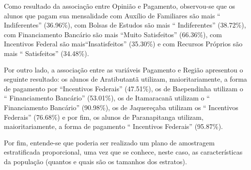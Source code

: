 	Como resultado da associação entre Opinião e Pagamento, observou-se que
	os alunos que pagam sua mensalidade com Auxílio de Familiares são mais
	`` Indiferentes'' (\num{36,96}\%), com Bolsas
	de Estudos são mais `` Indiferentes''
	(\num{38,72}\%), com Financiamento Bancário são mais ``Muito Satisfeitos''
    (\num{66,36}\%), com Incentivos Federal são mais``Insatisfeitos'' (\num{35,30}\%) e com
	Recursos Próprios são mais ``
	Satisfeitos'' (\num{34,48}\%).

	Por outro lado, a associação entre as variáveis Pagamento e Região
	apresentou o seguinte resultado: os alunos de Aratibutantã utilizam,
	maioritariamente, a forma de pagamento por ``Incentivos Federais''
    (\num{47,51}\%), os de Baependinha utilizam o
	`` Financiamento Bancário'' (\num{53,01}\%), os
	de Itamaracanã utilizam o `` Financiamento Bancário'' 
    (\num{90,98}\%), os de Jaquereçaba utilizam os
	`` Incentivos Federais'' (\num{76,68}\%) e por
	fim, os alunos de Paranapitanga utilizam, maioritariamente, a forma de
	pagamento `` Incentivos Federais'' (\num{95,87}\%). 

	Por fim, entende-se que poderia ser realizado um plano de amostragem estratificada 
	proporcional, uma vez que se conhece, neste caso, as características da população 
	(quantos e quais são os tamanhos dos estratos). 
